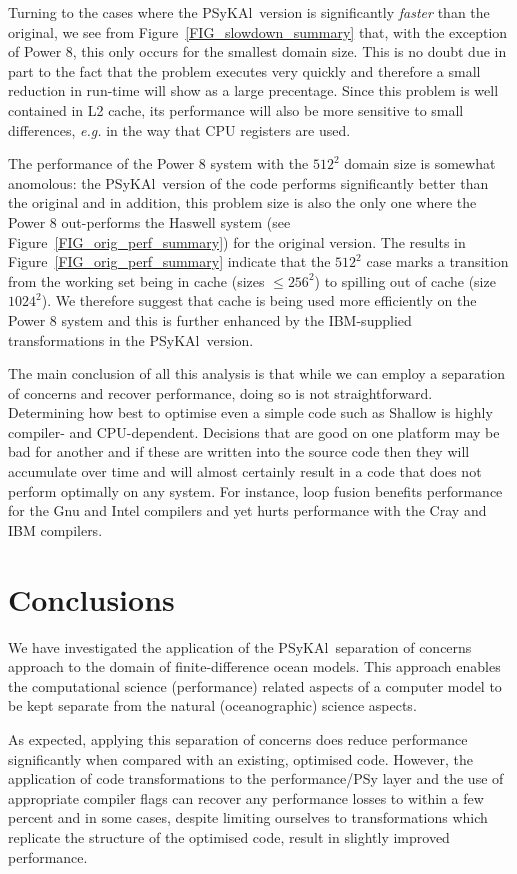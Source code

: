 \documentclass{IOS-Book-Article}
\newcommand{\psykal}{{PS}y{KA}l}
\begin{document}
Turning to the cases where the \psykal\ version is significantly
{\em faster} than the original, we see from
Figure~\ref{FIG_slowdown_summary} that, with the exception of Power 8,
this only occurs for the smallest domain size. This is no doubt due in
part to the fact that the problem executes very quickly and therefore
a small reduction in run-time will show as a large precentage. Since
this problem is well contained in L2 cache, its performance will also
be more sensitive to small differences, {\it e.g.} in the way that CPU
registers are used. 

The performance of the Power 8 system with the $512^2$ domain size is
somewhat anomolous: the \psykal\ version of the code performs
significantly better than the original and in addition, this problem
size is also the only one where the Power 8 out-performs the Haswell
system (see Figure~\ref{FIG_orig_perf_summary}) for the original
version.  The results in Figure~\ref{FIG_orig_perf_summary} indicate
that the $512^2$ case marks a transition from the working set being in
cache (sizes $\leq 256^2$) to spilling out of cache (size $1024^2$). We
therefore suggest that cache is being used more efficiently on the
Power 8 system and this is further enhanced by the IBM-supplied
transformations in the \psykal\ version.

The main conclusion of all this analysis is that while we can employ a
separation of concerns and recover performance, doing so is not
straightforward. Determining how best to optimise even a simple code
such as Shallow is highly compiler- and CPU-dependent. Decisions that
are good on one platform may be bad for another and if these are
written into the source code then they will accumulate over time and
will almost certainly result in a code that does not perform optimally
on any system. For instance, loop fusion benefits performance for the
Gnu and Intel compilers and yet hurts performance with the Cray and
IBM compilers.

\section{Conclusions}

We have investigated the application of the \psykal\ separation of
concerns approach to the domain of finite-difference ocean
models. This approach enables the computational science (performance)
related aspects of a computer model to be kept separate from the
natural (oceanographic) science aspects.

As expected, applying this separation of concerns does reduce
performance significantly when compared with an existing, optimised
code. However, the application of code transformations to the
performance/PSy layer and the use of appropriate compiler flags can
recover any performance losses to within a few percent and in some
cases, despite limiting ourselves to transformations which replicate
the structure of the optimised code, result in slightly improved
performance.
\end{document}
